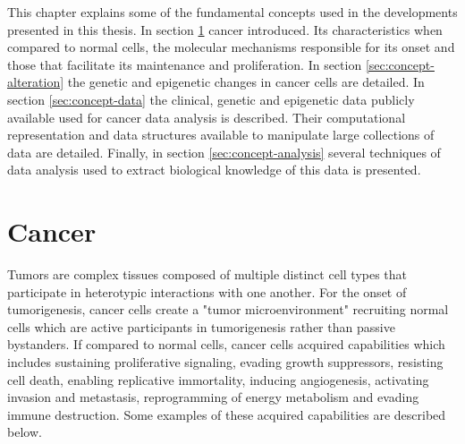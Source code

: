 This chapter explains some of the fundamental concepts used in the developments presented in this thesis.
In section \ref{sec:concept-cancer}  cancer introduced. Its characteristics when compared to normal cells,
the molecular mechanisms responsible for its onset and those that facilitate its maintenance and proliferation.
In section \ref{sec:concept-alteration} the genetic and epigenetic changes in cancer cells are detailed.
In section \ref{sec:concept-data} the clinical, genetic and epigenetic data publicly available used for cancer data analysis is described. Their computational representation and data structures available to manipulate large collections of data are detailed.
Finally, in section \ref{sec:concept-analysis} several techniques of data analysis
used to extract biological knowledge of this data is presented.

\section{Cancer} \label{sec:concept-cancer}

Tumors are complex tissues composed of multiple distinct cell types that participate in heterotypic interactions with one another. For the onset of tumorigenesis,  cancer cells create a "tumor microenvironment"
 recruiting normal cells which are active participants in tumorigenesis rather than passive bystanders.
If compared to normal cells, cancer cells acquired capabilities which includes sustaining proliferative signaling,
 evading growth suppressors, resisting cell death, enabling replicative immortality,
 inducing angiogenesis, activating invasion and metastasis, reprogramming of energy metabolism and
 evading immune destruction.  Some examples of these acquired capabilities are described below.

